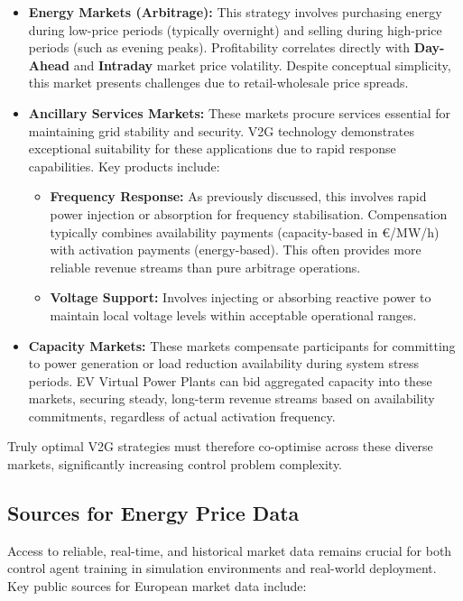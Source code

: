 \begin{itemize}
    \item \textbf{Energy Markets (Arbitrage):} This strategy involves purchasing energy during low-price periods (typically overnight) and selling during high-price periods (such as evening peaks). Profitability correlates directly with \textbf{Day-Ahead} and \textbf{Intraday} market price volatility. Despite conceptual simplicity, this market presents challenges due to retail-wholesale price spreads.
    
    \item \textbf{Ancillary Services Markets:} These markets procure services essential for maintaining grid stability and security. V2G technology demonstrates exceptional suitability for these applications due to rapid response capabilities. Key products include:
        \begin{itemize}
            \item \textbf{Frequency Response:} As previously discussed, this involves rapid power injection or absorption for frequency stabilisation. Compensation typically combines availability payments (capacity-based in €/MW/h) with activation payments (energy-based). This often provides more reliable revenue streams than pure arbitrage operations.
            \item \textbf{Voltage Support:} Involves injecting or absorbing reactive power to maintain local voltage levels within acceptable operational ranges.
        \end{itemize}
        
    \item \textbf{Capacity Markets:} These markets compensate participants for committing to power generation or load reduction availability during system stress periods. EV Virtual Power Plants can bid aggregated capacity into these markets, securing steady, long-term revenue streams based on availability commitments, regardless of actual activation frequency.
\end{itemize}
\noindent
Truly optimal V2G strategies must therefore co-optimise across these diverse markets, significantly increasing control problem complexity.

\subsection{Sources for Energy Price Data}

Access to reliable, real-time, and historical market data remains crucial for both control agent training in simulation environments and real-world deployment. Key public sources for European market data include:

